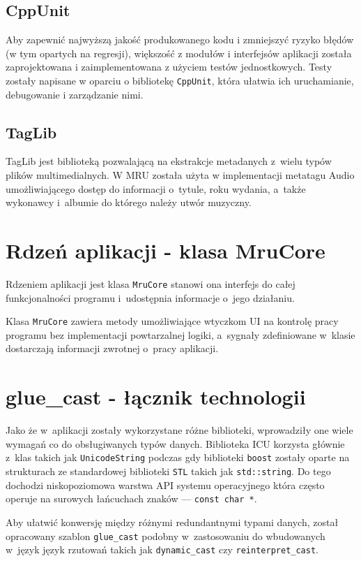 \subsection{CppUnit}
\par
Aby zapewnić najwyższą jakość produkowanego kodu i zmniejszyć ryzyko błędów (w tym opartych na regresji), większość z modułów i interfejsów aplikacji została zaprojektowana i zaimplementowana z użyciem testów jednostkowych. Testy zostały napisane w oparciu o bibliotekę \texttt{CppUnit}, która ułatwia ich uruchamianie, debugowanie i zarządzanie nimi.

\subsection{TagLib}
TagLib jest biblioteką pozwalającą na ekstrakcje metadanych z~wielu typów plików multimedialnych. W MRU została użyta w implementacji metatagu Audio umożliwiającego dostęp do informacji o~tytule, roku wydania, a~także wykonawcy i~albumie do którego należy utwór muzyczny.

\section{Rdzeń aplikacji - klasa MruCore}
Rdzeniem aplikacji jest klasa \texttt{MruCore} stanowi ona interfejs do całej funkcjonalności programu i~udostępnia informacje o~jego działaniu.
\par
Klasa \texttt{MruCore} zawiera metody umożliwiające wtyczkom UI na kontrolę pracy programu bez implementacji powtarzalnej logiki, a~sygnały zdefiniowane w~klasie dostarczają informacji zwrotnej o~pracy aplikacji.

\section{glue\_cast - łącznik technologii}
Jako że w~aplikacji zostały wykorzystane różne biblioteki, wprowadziły one wiele wymagań co do obsługiwanych typów danych.
Biblioteka ICU korzysta głównie z~klas takich jak \texttt{UnicodeString} podczas gdy biblioteki \texttt{boost} zostały oparte na strukturach ze standardowej biblioteki \texttt{STL} takich jak \texttt{std::string}. Do tego dochodzi niskopoziomowa warstwa API systemu operacyjnego która często operuje na surowych łańcuchach znaków --- \texttt{const char *}.
\par
Aby ułatwić konwersję między różnymi redundantnymi typami danych, został opracowany szablon \texttt{glue\_cast} podobny w~zastosowaniu do wbudowanych w~język język rzutowań takich jak \texttt{dynamic\_cast} czy \texttt{reinterpret\_cast}.

